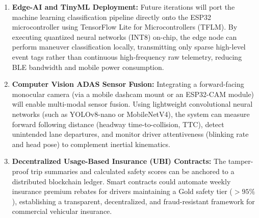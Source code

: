 \begin{enumerate}
    \item \textbf{Edge-AI and TinyML Deployment:}
    Future iterations will port the machine learning classification pipeline directly onto the ESP32 microcontroller using TensorFlow Lite for Microcontrollers (TFLM). By executing quantized neural networks (INT8) on-chip, the edge node can perform maneuver classification locally, transmitting only sparse high-level event tags rather than continuous high-frequency raw telemetry, reducing BLE bandwidth and mobile power consumption.
    
    \item \textbf{Computer Vision ADAS Sensor Fusion:}
    Integrating a forward-facing monocular camera (via a mobile dashcam mount or an ESP32-CAM module) will enable multi-modal sensor fusion. Using lightweight convolutional neural networks (such as YOLOv8-nano or MobileNetV4), the system can measure forward following distance (headway time-to-collision, TTC), detect unintended lane departures, and monitor driver attentiveness (blinking rate and head pose) to complement inertial kinematics.
    
    \item \textbf{Decentralized Usage-Based Insurance (UBI) Contracts:}
    The tamper-proof trip summaries and calculated safety scores can be anchored to a distributed blockchain ledger. Smart contracts could automate weekly insurance premium rebates for drivers maintaining a Gold safety tier ($>95\%$), establishing a transparent, decentralized, and fraud-resistant framework for commercial vehicular insurance.
\end{enumerate}
